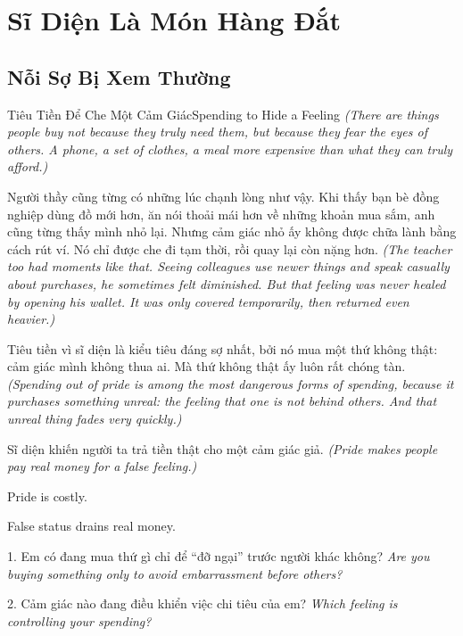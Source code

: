 \chapter{Sĩ Diện Là Món Hàng Đắt}

\section{Nỗi Sợ Bị Xem Thường}
\begin{truyen}{Tiêu Tiền Để Che Một Cảm Giác}{Spending to Hide a Feeling}
\textit{(There are things people buy not because they truly need them, but because they fear the eyes of others. A phone, a set of clothes, a meal more expensive than what they can truly afford.)}

Người thầy cũng từng có những lúc chạnh lòng như vậy. Khi thấy bạn bè đồng nghiệp dùng đồ mới hơn, ăn nói thoải mái hơn về những khoản mua sắm, anh cũng từng thấy mình nhỏ lại. Nhưng cảm giác nhỏ ấy không được chữa lành bằng cách rút ví. Nó chỉ được che đi tạm thời, rồi quay lại còn nặng hơn.
\textit{(The teacher too had moments like that. Seeing colleagues use newer things and speak casually about purchases, he sometimes felt diminished. But that feeling was never healed by opening his wallet. It was only covered temporarily, then returned even heavier.)}

Tiêu tiền vì sĩ diện là kiểu tiêu đáng sợ nhất, bởi nó mua một thứ không thật: cảm giác mình không thua ai. Mà thứ không thật ấy luôn rất chóng tàn.
\textit{(Spending out of pride is among the most dangerous forms of spending, because it purchases something unreal: the feeling that one is not behind others. And that unreal thing fades very quickly.)}
\end{truyen}

\begin{baihoc}
Sĩ diện khiến người ta trả tiền thật cho một cảm giác giả.
\textit{(Pride makes people pay real money for a false feeling.)}
\end{baihoc}

\begin{ghinhoanh}
Pride is costly.

False status drains real money.
\end{ghinhoanh}

\begin{tuhocnhanh}
1. Em có đang mua thứ gì chỉ để ``đỡ ngại'' trước người khác không? \textit{Are you buying something only to avoid embarrassment before others?}

2. Cảm giác nào đang điều khiển việc chi tiêu của em? \textit{Which feeling is controlling your spending?}
\end{tuhocnhanh}
\ngancach

